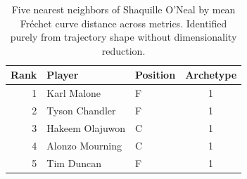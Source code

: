 \begin{table}[htbp]
  \centering\small
  \begin{tabular}{rllc}
    \toprule
    Rank & Player & Position & Archetype \\
    \midrule
    1 & Karl Malone & F & 1 \\
    2 & Tyson Chandler & F & 1 \\
    3 & Hakeem Olajuwon & C & 1 \\
    4 & Alonzo Mourning & C & 1 \\
    5 & Tim Duncan & F & 1 \\
    \bottomrule
  \end{tabular}
  \caption{Five nearest neighbors of Shaquille O'Neal by mean Fr\'{e}chet curve distance across metrics. Identified purely from trajectory shape without dimensionality reduction.}
  \label{tab:Shaquille_O_Neal_frechet_curve_neighbors}
\end{table}

